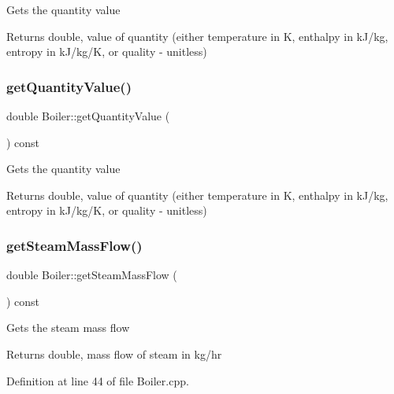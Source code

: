 Gets the quantity value \begin{DoxyReturn}{Returns}
double, value of quantity (either temperature in K, enthalpy in k\+J/kg, entropy in k\+J/kg/K, or quality -\/ unitless) 
\end{DoxyReturn}
\mbox{\label{class_boiler_a78370a174135e6cc95abcd3b7ac2f947}} 
\subsubsection{\texorpdfstring{get\+Quantity\+Value()}{getQuantityValue()}\hspace{0.1cm}{\footnotesize\ttfamily [3/3]}}
{\footnotesize\ttfamily double Boiler\+::get\+Quantity\+Value (\begin{DoxyParamCaption}{ }\end{DoxyParamCaption}) const}

Gets the quantity value \begin{DoxyReturn}{Returns}
double, value of quantity (either temperature in K, enthalpy in k\+J/kg, entropy in k\+J/kg/K, or quality -\/ unitless) 
\end{DoxyReturn}
\mbox{\label{class_boiler_a4101e71234995558a451dcab145b5fc9}} 
\subsubsection{\texorpdfstring{get\+Steam\+Mass\+Flow()}{getSteamMassFlow()}\hspace{0.1cm}{\footnotesize\ttfamily [1/3]}}
{\footnotesize\ttfamily double Boiler\+::get\+Steam\+Mass\+Flow (\begin{DoxyParamCaption}{ }\end{DoxyParamCaption}) const}

Gets the steam mass flow \begin{DoxyReturn}{Returns}
double, mass flow of steam in kg/hr 
\end{DoxyReturn}


Definition at line 44 of file Boiler.\+cpp.

\mbox{\label{class_boiler_a4101e71234995558a451dcab145b5fc9}} 

